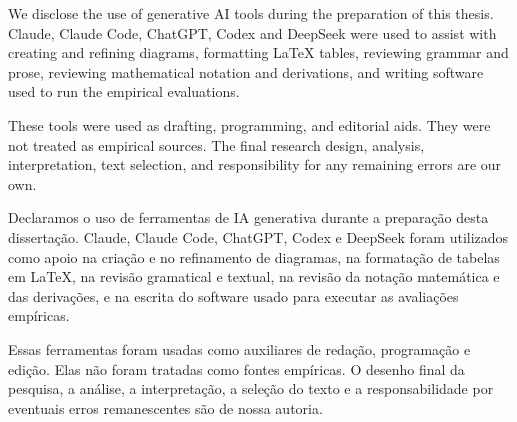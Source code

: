 


\begin{agradecimentos}

\lang
{
    We disclose the use of generative AI tools during the preparation of this
    thesis. Claude, Claude Code, ChatGPT, Codex and DeepSeek were used to assist with
    creating and refining diagrams, formatting \LaTeX{} tables, reviewing grammar
    and prose, reviewing mathematical notation and derivations, and writing
    software used to run the empirical evaluations.

    These tools were used as drafting, programming, and editorial aids. They were
    not treated as empirical sources. The final research design, analysis,
    interpretation, text selection, and responsibility for any remaining errors
    are our own.
}
{
    Declaramos o uso de ferramentas de IA generativa durante a preparação desta
    dissertação. Claude, Claude Code, ChatGPT, Codex e DeepSeek foram utilizados como apoio
    na criação e no refinamento de diagramas, na formatação de tabelas em
    \LaTeX{}, na revisão gramatical e textual, na revisão da notação matemática
    e das derivações, e na escrita do software usado para executar as avaliações
    empíricas.

    Essas ferramentas foram usadas como auxiliares de redação, programação e
    edição. Elas não foram tratadas como fontes empíricas. O desenho final da
    pesquisa, a análise, a interpretação, a seleção do texto e a responsabilidade
    por eventuais erros remanescentes são de nossa autoria.
}

\end{agradecimentos}


%
%
%
